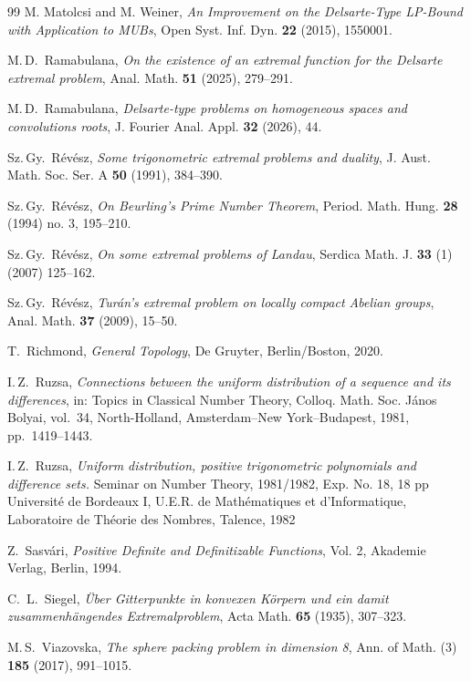 \documentclass[[a4paper,english,12pt]{amsart}
\theoremstyle{plain}
\theoremstyle{remark}
\begin{document}
\begin{thebibliography}{99}
M. Matolcsi and M. Weiner,
\emph{An Improvement on the Delsarte-Type LP-Bound with Application to MUBs}, Open Syst. Inf. Dyn. \textbf{22} (2015), 1550001.

M.\,D.~Ramabulana,
\emph{On the existence of an extremal function for the Delsarte extremal problem},
Anal. Math. \textbf{51} (2025), 279--291.

M.\,D.~Ramabulana, \emph{Delsarte-type problems on homogeneous spaces and convolutions roots}, J. Fourier Anal. Appl. \textbf{32} (2026), 44.

Sz.\,Gy.~Révész, \emph{Some trigonometric extremal problems and duality},
J. Aust. Math. Soc. Ser. A \textbf{50} (1991), 384--390.

Sz.\,Gy.~R\'ev\'esz, \emph{On Beurling's Prime Number Theorem}, Period. Math. Hung. {\bf 28} (1994) no. 3, 195--210.

Sz.\,Gy.~Révész, \emph{On some extremal problems of Landau}, Serdica Math. J. {\bf 33} (1) (2007) 125–162.

Sz.\,Gy.~R\'ev\'esz,
\emph{Tur{\'a}n’s extremal problem on locally compact Abelian groups},
Anal. Math. \textbf{37} (2009), 15--50.

T.~Richmond, \emph{General Topology}, De Gruyter, Berlin/Boston, 2020.

I.\,Z.~Ruzsa, \emph{Connections between the uniform distribution of a sequence and its differences},
in: Topics in Classical Number Theory,
Colloq. Math. Soc. János Bolyai, vol.~34,
North-Holland, Amsterdam--New York--Budapest, 1981, pp.~1419--1443.

I.\,Z.~Ruzsa, 
\emph{Uniform distribution, positive trigonometric polynomials and difference sets.} Seminar on Number Theory, 1981/1982, Exp. No. 18, 18 pp
Université de Bordeaux I, U.E.R. de Mathématiques et d'Informatique, Laboratoire de Théorie des Nombres, Talence, 1982

Z.~Sasv\'{a}ri, \emph{Positive Definite and Definitizable Functions}, Vol. 2, Akademie Verlag, Berlin, 1994.

C.~L.~Siegel, \emph{{\"U}ber Gitterpunkte in konvexen K{\"o}rpern und ein damit zusammenh{\"a}ngendes Extremalproblem},
Acta Math. \textbf{65} (1935), 307--323.

M.\,S.~Viazovska, \textit{The sphere packing problem in dimension 8}, Ann. of Math. (3) \textbf{185} (2017), 991--1015.


\end{thebibliography}
\end{document}
